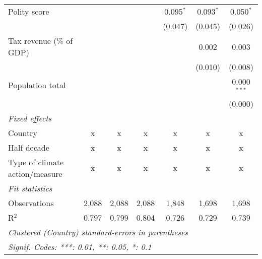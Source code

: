 \begin{tabular}{lcccccc}
   Polity score                                                      &              &              &               & 0.095$^{*}$   & 0.093$^{*}$   & 0.050$^{*}$\\   
                                                                     &              &              &               & (0.047)       & (0.045)       & (0.026)\\   
   Tax revenue (\% of GDP)                                           &              &              &               &               & 0.002         & 0.003\\   
                                                                     &              &              &               &               & (0.010)       & (0.008)\\   
   Population total                                                  &              &              &               &               &               & 0.000$^{***}$\\   
                                                                     &              &              &               &               &               & (0.000)\\   
   \emph{Fixed effects}\\
   Country                                                           & x            & x            & x             & x             & x             & x\\  
   Half decade                                                       & x            & x            & x             & x             & x             & x\\  
   Type of climate action/measure                                    & x            & x            & x             & x             & x             & x\\  
   \midrule \emph{Fit statistics}\\
   Observations                                                      & 2,088        & 2,088        & 2,088         & 1,848         & 1,698         & 1,698\\  
   R$^2$                                                             & 0.797        & 0.799        & 0.804         & 0.726         & 0.729         & 0.739\\  
   \midrule
   \multicolumn{7}{l}{\emph{Clustered (Country) standard-errors in parentheses}}\\
   \multicolumn{7}{l}{\emph{Signif. Codes: ***: 0.01, **: 0.05, *: 0.1}}\\
\end{tabular}
\par\endgroup


